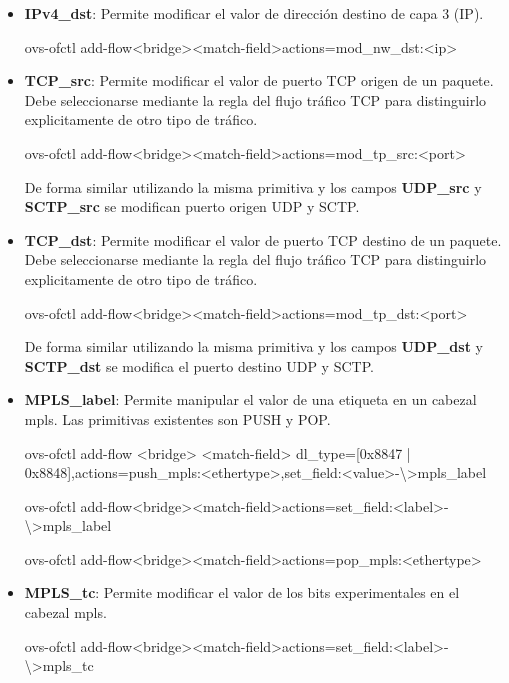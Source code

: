 \begin{itemize}
\item \textbf{IPv4\_dst}: Permite modificar el valor de direcci\'on destino de capa 3 (IP).

\begin{center}
ovs-ofctl add-flow<bridge><match-field>actions=mod\_nw\_dst:<ip>
\end{center}


\item \textbf{TCP\_src}: Permite modificar el valor de puerto TCP origen de un paquete. Debe seleccionarse mediante la regla del flujo tr\'afico TCP para distinguirlo explicitamente de otro tipo de tr\'afico. 

\begin{center}
ovs-ofctl add-flow<bridge><match-field>actions=mod\_tp\_src:<port>
\end{center}

De forma similar utilizando la misma primitiva y los campos \textbf{UDP\_src} y \textbf{SCTP\_src} se modifican puerto origen UDP y SCTP.

\item \textbf{TCP\_dst}: Permite modificar el valor de puerto TCP destino de un paquete. Debe seleccionarse mediante la regla del flujo tr\'afico TCP para distinguirlo explicitamente de otro tipo de tr\'afico. 

\begin{center}
ovs-ofctl add-flow<bridge><match-field>actions=mod\_tp\_dst:<port>
\end{center}
            
De forma similar utilizando la misma primitiva y los campos \textbf{UDP\_dst} y \textbf{SCTP\_dst} se modifica el puerto destino UDP y SCTP. 
                
\item \textbf{MPLS\_label}: Permite manipular el valor de una etiqueta en un cabezal mpls. Las primitivas existentes son PUSH y POP.

\begin{center}
ovs-ofctl add-flow <bridge> <match-field> dl\_type=[0x8847 | 0x8848],actions=push\_mpls:<ethertype>,set\_field:<value>-\textbackslash >mpls\_label
\end{center}

\begin{center}
ovs-ofctl add-flow<bridge><match-field>actions=set\_field:<label>-\textbackslash >mpls\_label
\end{center}

\begin{center}
ovs-ofctl add-flow<bridge><match-field>actions=pop\_mpls:<ethertype>
\end{center}

\item \textbf{MPLS\_tc}: Permite modificar el valor de los bits experimentales en el cabezal mpls.

\begin{center}
ovs-ofctl add-flow<bridge><match-field>actions=set\_field:<label>-\textbackslash >mpls\_tc
\end{center}

\end{itemize}
